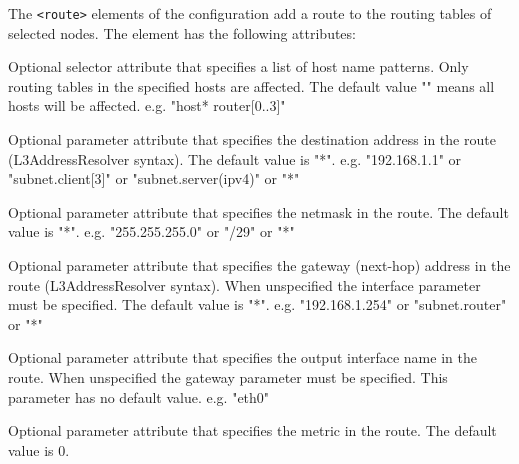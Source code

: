 The \verb!<route>! elements of the configuration add a route to the
routing tables of selected nodes. The element has the following attributes:
\begin{compactitem}
    \item {}
      Optional selector attribute that specifies a list of host name patterns.
      Only routing tables in the specified hosts are affected. The default
      value "" means all hosts will be affected.
      e.g. "host* router[0..3]"

    \item {}
      Optional parameter attribute that specifies the destination address in
      the route (L3AddressResolver syntax). The default value is "*".
      e.g. "192.168.1.1" or "subnet.client[3]" or "subnet.server(ipv4)" or "*"

    \item {}
      Optional parameter attribute that specifies the netmask in the route.
      The default value is "*".
      e.g. "255.255.255.0" or "/29" or "*"

    \item {}
      Optional parameter attribute that specifies the gateway (next-hop)
      address in the route (L3AddressResolver syntax). When unspecified
      the interface parameter must be specified. The default value is "*".
      e.g. "192.168.1.254" or "subnet.router" or "*"

    \item {}
      Optional parameter attribute that specifies the output interface name
      in the route. When unspecified the gateway parameter must be specified.
      This parameter has no default value.
      e.g. "eth0"

    \item {}
      Optional parameter attribute that specifies the metric in the route.
      The default value is 0.
\end{compactitem}

